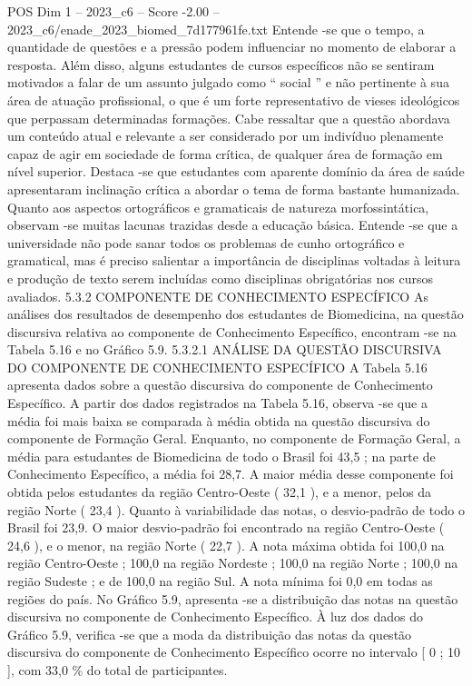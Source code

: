 \begin{textsample}{POS Dim 1 – 2023\_c6 – Score -2.00 – 2023\_c6/enade\_2023\_biomed\_7d177961fe.txt}
Entende -se que o tempo, a quantidade de questões e a pressão podem influenciar no momento de elaborar a resposta.
Além disso, alguns estudantes de cursos específicos não se sentiram motivados a falar de um assunto julgado como “ social ” e não pertinente à sua área de atuação profissional, o que é um forte representativo de vieses ideológicos que perpassam determinadas formações.
Cabe ressaltar que a questão abordava um conteúdo atual e relevante a ser considerado por um indivíduo plenamente capaz de agir em sociedade de forma crítica, de qualquer área de formação em nível superior.
Destaca -se que estudantes com aparente domínio da área de saúde apresentaram inclinação crítica a abordar o tema de forma bastante humanizada.
Quanto aos aspectos ortográficos e gramaticais de natureza morfossintática, observam -se muitas lacunas trazidas desde a educação básica.
Entende -se que a universidade não pode sanar todos os problemas de cunho ortográfico e gramatical, mas é preciso salientar a importância de disciplinas voltadas à leitura e produção de texto serem incluídas como disciplinas obrigatórias nos cursos avaliados. 5.3.2 COMPONENTE DE CONHECIMENTO ESPECÍFICO As análises dos resultados de desempenho dos estudantes de Biomedicina, na questão discursiva relativa ao componente de Conhecimento Específico, encontram -se na Tabela 5.16 e no Gráfico 5.9. 5.3.2.1 ANÁLISE DA QUESTÃO DISCURSIVA DO COMPONENTE DE CONHECIMENTO ESPECÍFICO A Tabela 5.16 apresenta dados sobre a questão discursiva do componente de Conhecimento Específico.
A partir dos dados registrados na Tabela 5.16, observa -se que a média foi mais baixa se comparada à média obtida na questão discursiva do componente de Formação Geral.
Enquanto, no componente de Formação Geral, a média para estudantes de Biomedicina de todo o Brasil foi 43,5 ; na parte de Conhecimento Específico, a média foi 28,7.
A maior média desse componente foi obtida pelos estudantes da região Centro-Oeste ( 32,1 ), e a menor, pelos da região Norte ( 23,4 ).
Quanto à variabilidade das notas, o desvio-padrão de todo o Brasil foi 23,9.
O maior desvio-padrão foi encontrado na região Centro-Oeste ( 24,6 ), e o menor, na região Norte ( 22,7 ).
A nota máxima obtida foi 100,0 na região Centro-Oeste ; 100,0 na região Nordeste ; 100,0 na região Norte ; 100,0 na região Sudeste ; e de 100,0 na região Sul.
A nota mínima foi 0,0 em todas as regiões do país.
No Gráfico 5.9, apresenta -se a distribuição das notas na questão discursiva no componente de Conhecimento Específico.
À luz dos dados do Gráfico 5.9, verifica -se que a moda da distribuição das notas da questão discursiva do componente de Conhecimento Específico ocorre no intervalo [ 0 ; 10 ], com 33,0 \% do total de participantes.

\end{textsample}
